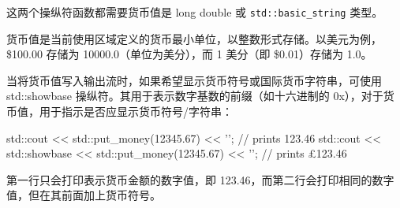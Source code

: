 这两个操纵符函数都需要货币值是 long double 或 \verb|std::basic_string| 类型。

\begin{myTip}
货币值是当前使用区域定义的货币最小单位，以整数形式存储。以美元为例，\$100.00 存储为 10000.0（单位为美分），而 1 美分（即 \$0.01）存储为 1.0。
\end{myTip}

当将货币值写入输出流时，如果希望显示货币符号或国际货币字符串，可使用 std::showbase 操纵符。其用于表示数字基数的前缀（如十六进制的 0x），对于货币值，用于指示是否应显示货币符号/字符串：

\begin{cpp}
std::cout << std::put_money(12345.67) << '\n';
// prints 123.46
std::cout << std::showbase << std::put_money(12345.67) << '\n';
// prints £123.46
\end{cpp}

第一行只会打印表示货币金额的数字值，即 123.46，而第二行会打印相同的数字值，但在其前面加上货币符号。

